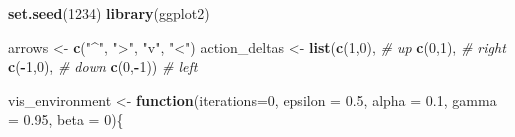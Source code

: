 \documentclass[
]{article}
\newenvironment{Shaded}{\begin{snugshade}}{\end{snugshade}}
\newcommand{\AttributeTok}[1]{\textcolor[rgb]{0.13,0.29,0.53}{#1}}
\newcommand{\CommentTok}[1]{\textcolor[rgb]{0.56,0.35,0.01}{\textit{#1}}}
\newcommand{\ControlFlowTok}[1]{\textcolor[rgb]{0.13,0.29,0.53}{\textbf{#1}}}
\newcommand{\DecValTok}[1]{\textcolor[rgb]{0.00,0.00,0.81}{#1}}
\newcommand{\FloatTok}[1]{\textcolor[rgb]{0.00,0.00,0.81}{#1}}
\newcommand{\FunctionTok}[1]{\textcolor[rgb]{0.13,0.29,0.53}{\textbf{#1}}}
\newcommand{\NormalTok}[1]{#1}
\newcommand{\OtherTok}[1]{\textcolor[rgb]{0.56,0.35,0.01}{#1}}
\newcommand{\SpecialCharTok}[1]{\textcolor[rgb]{0.81,0.36,0.00}{\textbf{#1}}}
\newcommand{\StringTok}[1]{\textcolor[rgb]{0.31,0.60,0.02}{#1}}
\begin{document}
\begin{Shaded}
\begin{Highlighting}[]
\FunctionTok{set.seed}\NormalTok{(}\DecValTok{1234}\NormalTok{)}
\FunctionTok{library}\NormalTok{(ggplot2)}

\NormalTok{arrows }\OtherTok{\textless{}{-}} \FunctionTok{c}\NormalTok{(}\StringTok{"\^{}"}\NormalTok{, }\StringTok{"\textgreater{}"}\NormalTok{, }\StringTok{"v"}\NormalTok{, }\StringTok{"\textless{}"}\NormalTok{)}
\NormalTok{action\_deltas }\OtherTok{\textless{}{-}} \FunctionTok{list}\NormalTok{(}\FunctionTok{c}\NormalTok{(}\DecValTok{1}\NormalTok{,}\DecValTok{0}\NormalTok{), }\CommentTok{\# up}
                      \FunctionTok{c}\NormalTok{(}\DecValTok{0}\NormalTok{,}\DecValTok{1}\NormalTok{), }\CommentTok{\# right}
                      \FunctionTok{c}\NormalTok{(}\SpecialCharTok{{-}}\DecValTok{1}\NormalTok{,}\DecValTok{0}\NormalTok{), }\CommentTok{\# down}
                      \FunctionTok{c}\NormalTok{(}\DecValTok{0}\NormalTok{,}\SpecialCharTok{{-}}\DecValTok{1}\NormalTok{)) }\CommentTok{\# left}

\NormalTok{vis\_environment }\OtherTok{\textless{}{-}} \ControlFlowTok{function}\NormalTok{(}\AttributeTok{iterations=}\DecValTok{0}\NormalTok{, }\AttributeTok{epsilon =} \FloatTok{0.5}\NormalTok{, }\AttributeTok{alpha =} \FloatTok{0.1}\NormalTok{, }\AttributeTok{gamma =} \FloatTok{0.95}\NormalTok{, }\AttributeTok{beta =} \DecValTok{0}\NormalTok{)\{}


\end{Highlighting}
\end{Shaded}
\end{document}
